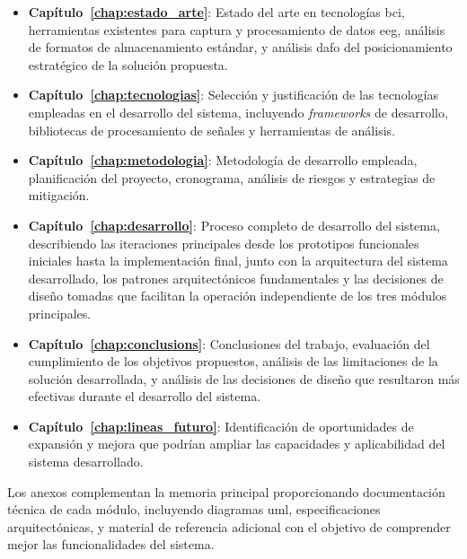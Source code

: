 \begin{itemize}
    \item \textbf{Capítulo~\ref{chap:estado_arte}}: Estado del arte en tecnologías \acrshort{bci}, herramientas existentes para captura y procesamiento de datos \acrshort{eeg}, análisis de formatos de almacenamiento estándar, y análisis \acrshort{dafo} del posicionamiento estratégico de la solución propuesta.
    
    \item \textbf{Capítulo~\ref{chap:tecnologias}}: Selección y justificación de las tecnologías empleadas en el desarrollo del sistema, incluyendo \textit{frameworks} de desarrollo, bibliotecas de procesamiento de señales y herramientas de análisis.
    
    \item \textbf{Capítulo~\ref{chap:metodologia}}: Metodología de desarrollo empleada, planificación del proyecto, cronograma, análisis de riesgos y estrategias de mitigación.
    
    \item \textbf{Capítulo~\ref{chap:desarrollo}}: Proceso completo de desarrollo del sistema, describiendo las iteraciones principales desde los prototipos funcionales iniciales hasta la implementación final, junto con la arquitectura del sistema desarrollado, los patrones arquitectónicos fundamentales y las decisiones de diseño tomadas que facilitan la operación independiente de los tres módulos principales.
    
    \item \textbf{Capítulo~\ref{chap:conclusions}}: Conclusiones del trabajo, evaluación del cumplimiento de los objetivos propuestos, análisis de las limitaciones de la solución desarrollada, y análisis de las decisiones de diseño que resultaron más efectivas durante el desarrollo del sistema.
    
    \item \textbf{Capítulo~\ref{chap:lineas_futuro}}: Identificación de oportunidades de expansión y mejora que podrían ampliar las capacidades y aplicabilidad del sistema desarrollado.
\end{itemize}

Los anexos complementan la memoria principal proporcionando documentación técnica de cada módulo, incluyendo diagramas \acrshort{uml}, especificaciones arquitectónicas, y material de referencia adicional con el objetivo de comprender mejor las funcionalidades del sistema.